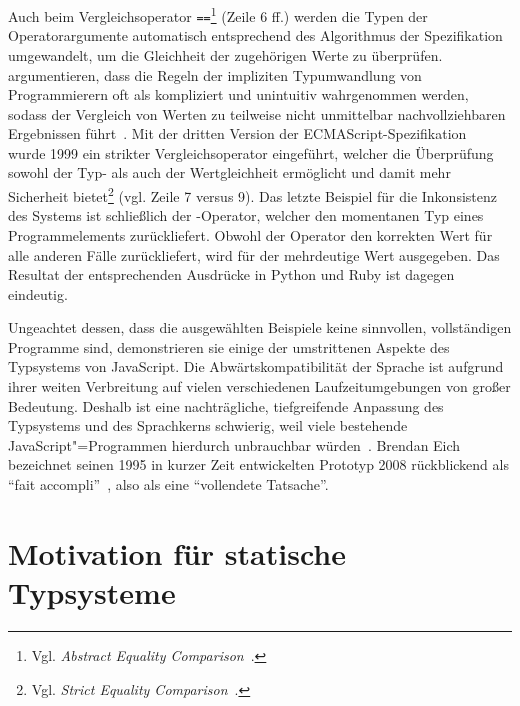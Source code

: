 Auch beim Vergleichsoperator \texttt{==}\footnote{Vgl. \textit{Abstract Equality Comparison}~\autocite[68]{ECMASCRIPT:2019}.} (Zeile 6 ff.) werden die Typen der Operatorargumente automatisch entsprechend des Algorithmus der Spezifikation umgewandelt, um die Gleichheit der zugehörigen Werte zu überprüfen. \citeauthor{PRADEL:2015} argumentieren, dass die Regeln der impliziten Typumwandlung von Programmierern oft als kompliziert und unintuitiv wahrgenommen werden, sodass der Vergleich von Werten zu teilweise nicht unmittelbar nachvollziehbaren Ergebnissen führt~\autocite{PRADEL:2015}.
Mit der dritten Version der ECMAScript-Spezifikation~\autocite{ECMASCRIPT:1999} wurde 1999 ein strikter Vergleichsoperator \code{===} eingeführt, welcher die Überprüfung sowohl der Typ- als auch der Wertgleichheit ermöglicht und damit mehr Sicherheit bietet\footnote{Vgl. \textit{Strict Equality Comparison}~\autocite[68]{ECMASCRIPT:2019}.} (vgl. Zeile 7 versus 9).
Das letzte Beispiel für die Inkonsistenz des Systems ist schließlich der -Operator, welcher den momentanen Typ eines Programmelements zurückliefert. Obwohl der Operator den korrekten Wert für alle anderen Fälle zurückliefert, wird für  der mehrdeutige Wert  ausgegeben. Das Resultat der entsprechenden Ausdrücke in Python und Ruby ist dagegen eindeutig.

Ungeachtet dessen, dass die ausgewählten Beispiele keine sinnvollen, vollständigen Programme sind, demonstrieren sie einige der umstrittenen Aspekte des Typsystems von JavaScript. Die Abwärtskompatibilität der Sprache ist aufgrund ihrer weiten Verbreitung auf vielen verschiedenen Laufzeitumgebungen von großer Bedeutung. Deshalb ist eine nachträgliche, tiefgreifende Anpassung des Typsystems und des Sprachkerns schwierig, weil viele bestehende JavaScript"=Programmen hierdurch unbrauchbar würden~\autocite[1]{CROCKFORD:JS_GOOD_PARTS}. Brendan Eich bezeichnet seinen 1995 in kurzer Zeit entwickelten Prototyp 2008 rückblickend als \enquote{fait accompli}~\autocite{EICH:POPULARITY}, also als eine \enquote{vollendete Tatsache}.

\section{Motivation für statische Typsysteme}

